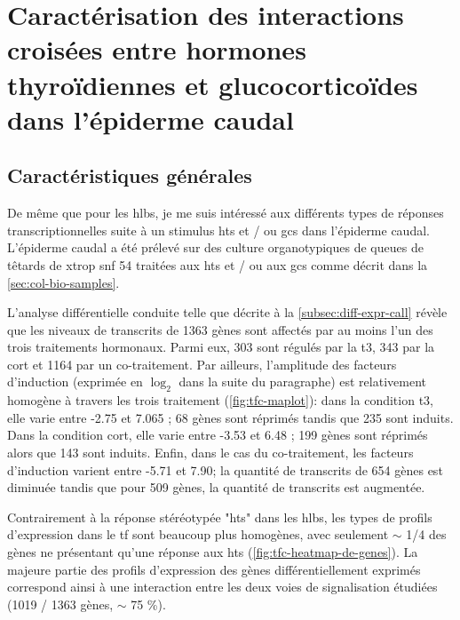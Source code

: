 \documentclass[../main.tex]{subfiles}
\begin{document}
\chapter{Caractérisation des interactions croisées entre hormones thyroïdiennes et glucocorticoïdes dans l'épiderme caudal}


\section{Caractéristiques générales}

De même que pour les \glspl{hlb}, je me suis intéressé aux différents types de réponses transcriptionnelles suite à un stimulus \glspl{ht} et / ou \glspl{gc} dans l'épiderme caudal.
L'épiderme caudal a été prélevé sur des culture organotypiques de queues de têtards de \gls{xtrop} \gls{snf} 54 traitées aux \glspl{ht} et / ou aux \glspl{gc} comme décrit dans la \autoref{sec:col-bio-samples}.

L'analyse différentielle conduite telle que décrite à la \autoref{subsec:diff-expr-call} révèle que les niveaux de transcrits de 1363 gènes sont affectés par au moins l'un des trois traitements hormonaux.
Parmi eux, 303 sont régulés par la \gls{t3}, 343 par la \gls{cort} et 1164 par un co-traitement.
Par ailleurs, l'amplitude des facteurs d'induction (exprimée en $\log_2$ dans la suite du paragraphe) est relativement homogène à travers les trois traitement (\autoref{fig:tfc-maplot}):
dans la condition \gls{t3}, elle varie entre -2.75 et 7.065 ; 68 gènes sont réprimés tandis que 235 sont induits.
Dans la condition \gls{cort}, elle varie entre -3.53 et 6.48 ; 199 gènes sont réprimés alors que 143 sont induits.
Enfin, dans le cas du co-traitement, les facteurs d'induction varient entre -5.71 et 7.90; la quantité de transcrits de 654 gènes est diminuée tandis que pour 509 gènes, la quantité de transcrits est augmentée.



Contrairement à la réponse stéréotypée "\glspl{ht}" dans les \glspl{hlb}, les types de profils d'expression dans le \gls{tf} sont beaucoup plus homogènes, avec seulement $\sim$ 1/4 des gènes ne présentant qu'une réponse aux \glspl{ht} (\autoref{fig:tfc-heatmap-de-genes}).
La majeure partie des profils d'expression des gènes différentiellement exprimés correspond ainsi à une interaction entre les deux voies de signalisation étudiées (1019 / 1363 gènes, $\sim$ 75 \%).


\end{document}

